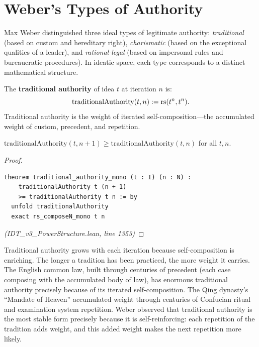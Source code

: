 \section{Weber's Types of Authority}

Max Weber distinguished three ideal types of legitimate authority:
\emph{traditional} (based on custom and hereditary right), \emph{charismatic}
(based on the exceptional qualities of a leader), and \emph{rational-legal}
(based on impersonal rules and bureaucratic procedures). In ideatic space,
each type corresponds to a distinct mathematical structure.

\begin{definition}
\label{def:traditional}
The \textbf{traditional authority} of idea $t$ at iteration $n$ is:
\[
  \mathrm{traditionalAuthority}(t, n) := \mathrm{rs}(t^n, t^n).
\]
Traditional authority is the weight of iterated self-composition---the
accumulated weight of custom, precedent, and repetition.
\end{definition}

\begin{theorem}
\label{thm:traditional-mono}
$\mathrm{traditionalAuthority}(t, n+1) \geq \mathrm{traditionalAuthority}(t, n)$
for all $t, n$.
\end{theorem}

\begin{proof}
\begin{lstlisting}
theorem traditional_authority_mono (t : I) (n : N) :
    traditionalAuthority t (n + 1)
    >= traditionalAuthority t n := by
  unfold traditionalAuthority
  exact rs_composeN_mono t n
\end{lstlisting}
\textit{(IDT\_v3\_PowerStructure.lean, line 1353)}
\end{proof}

\begin{interpretation}
Traditional authority grows with each iteration because self-composition is
enriching. The longer a tradition has been practiced, the more weight it
carries. The English common law, built through centuries of precedent (each
case composing with the accumulated body of law), has enormous traditional
authority precisely because of its iterated self-composition. The Qing dynasty's
``Mandate of Heaven'' accumulated weight through centuries of Confucian ritual
and examination system repetition. Weber observed that traditional authority is
the most stable form precisely because it is self-reinforcing: each repetition
of the tradition adds weight, and this added weight makes the next repetition
more likely.
\end{interpretation}

